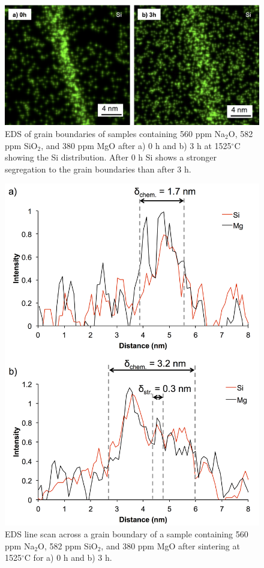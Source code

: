 \newpage
\begin{figure}[H]
	\centering
	\includegraphics[width=\textwidth]{Chapter-3/Figures/Figure8.png}
	\caption{EDS of grain boundaries of samples containing 560 ppm Na$_{2}$O, 582 ppm SiO$_{2}$, and 380 ppm MgO after a) 0 h and b) 3 h at 1525$^{\circ}$C showing the Si distribution. After 0 h Si shows a stronger segregation to the grain boundaries than after 3 h.}
	\label{Ch3-figure:Figure8}
\end{figure}

\newpage
\begin{figure}[H]
	\centering
	\includegraphics[width=\textwidth]{Chapter-3/Figures/Figure9.png}
	\caption{EDS line scan across a grain boundary of a sample containing 560 ppm Na$_{2}$O, 582 ppm SiO$_{2}$, and 380 ppm MgO after sintering at 1525$^{\circ}$C for a) 0 h and b) 3 h.}
	\label{Ch3-figure:Figure9}
\end{figure}

